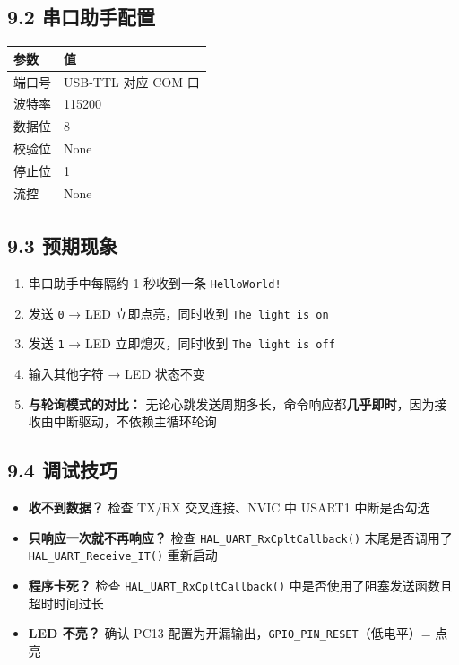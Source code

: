 \documentclass[
  chinese,
  UTF8,
  oneside,
  openany]{ctexbook}
\providecommand{\tightlist}{%
  \setlength{\itemsep}{0pt}\setlength{\parskip}{0pt}}
\begin{document}
\subsection{9.2
串口助手配置}\label{ux4e32ux53e3ux52a9ux624bux914dux7f6e-1}

\begin{longtable}[]{@{}ll@{}}
\toprule\noalign{}
参数 & 值 \\
\midrule\noalign{}
\endhead
\bottomrule\noalign{}
\endlastfoot
端口号 & USB-TTL 对应 COM 口 \\
波特率 & 115200 \\
数据位 & 8 \\
校验位 & None \\
停止位 & 1 \\
流控 & None \\
\end{longtable}

\subsection{9.3 预期现象}\label{ux9884ux671fux73b0ux8c61-2}

\begin{enumerate}
\def\labelenumi{\arabic{enumi}.}
\tightlist
\item
  串口助手中每隔约 1 秒收到一条 \texttt{HelloWorld!}
\item
  发送 \texttt{0} → LED 立即点亮，同时收到 \texttt{The\ light\ is\ on}
\item
  发送 \texttt{1} → LED 立即熄灭，同时收到 \texttt{The\ light\ is\ off}
\item
  输入其他字符 → LED 状态不变
\item
  \textbf{与轮询模式的对比：}
  无论心跳发送周期多长，命令响应都\textbf{几乎即时}，因为接收由中断驱动，不依赖主循环轮询
\end{enumerate}

\subsection{9.4 调试技巧}\label{ux8c03ux8bd5ux6280ux5de7-1}

\begin{itemize}
\tightlist
\item
  \textbf{收不到数据？} 检查 TX/RX 交叉连接、NVIC 中 USART1 中断是否勾选
\item
  \textbf{只响应一次就不再响应？} 检查
  \texttt{HAL\_UART\_RxCpltCallback()} 末尾是否调用了
  \texttt{HAL\_UART\_Receive\_IT()} 重新启动
\item
  \textbf{程序卡死？} 检查 \texttt{HAL\_UART\_RxCpltCallback()}
  中是否使用了阻塞发送函数且超时时间过长
\item
  \textbf{LED 不亮？} 确认 PC13
  配置为开漏输出，\texttt{GPIO\_PIN\_RESET}（低电平）= 点亮
\end{itemize}
\end{document}
